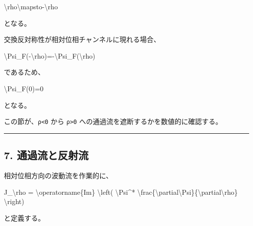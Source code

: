 \documentclass[
  a4paper,
]{article}
\newenvironment{Shaded}{}{}
\newcommand{\NormalTok}[1]{#1}
\begin{document}
\begin{Shaded}
\begin{Highlighting}[]
\NormalTok{\textbackslash{}rho\textbackslash{}mapsto{-}\textbackslash{}rho}
\end{Highlighting}
\end{Shaded}

となる。

交換反対称性が相対位相チャンネルに現れる場合、

\begin{Shaded}
\begin{Highlighting}[]
\NormalTok{\textbackslash{}Psi\_F({-}\textbackslash{}rho)={-}\textbackslash{}Psi\_F(\textbackslash{}rho)}
\end{Highlighting}
\end{Shaded}

であるため、

\begin{Shaded}
\begin{Highlighting}[]
\NormalTok{\textbackslash{}Psi\_F(0)=0}
\end{Highlighting}
\end{Shaded}

となる。

この節が、\texttt{ρ\textless{}0} から \texttt{ρ\textgreater{}0}
への通過流を遮断するかを数値的に確認する。

\begin{center}\rule{0.5\linewidth}{0.5pt}\end{center}

\subsection{7.
通過流と反射流}\label{ux901aux904eux6d41ux3068ux53cdux5c04ux6d41}

相対位相方向の波動流を作業的に、

\begin{Shaded}
\begin{Highlighting}[]
\NormalTok{J\_\textbackslash{}rho}
\NormalTok{=}
\NormalTok{\textbackslash{}operatorname\{Im\}}
\NormalTok{\textbackslash{}left(}
\NormalTok{\textbackslash{}Psi\^{}*}
\NormalTok{\textbackslash{}frac\{\textbackslash{}partial\textbackslash{}Psi\}\{\textbackslash{}partial\textbackslash{}rho\}}
\NormalTok{\textbackslash{}right)}
\end{Highlighting}
\end{Shaded}

と定義する。
\end{document}
